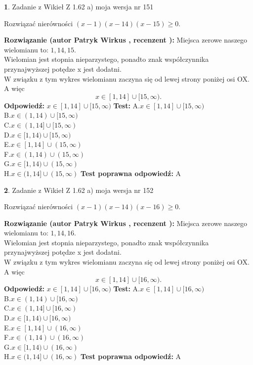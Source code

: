 \documentclass[12pt, a4paper]{article}
\theoremstyle{definition} %
\newtheorem{zad}{}
\newcommand{\zadStart}[1]{\begin{zad}#1\newline}
\newcommand{\zadStop}{\end{zad}}
\newcommand{\rozwStart}[2]{\noindent \textbf{Rozwiązanie (autor #1 , recenzent #2): }\newline}
\newcommand{\rozwStop}{\newline}
\newcommand{\odpStart}{\noindent \textbf{Odpowiedź:}\newline}
\newcommand{\odpStop}{\newline}
\newcommand{\testStart}{\noindent \textbf{Test:}\newline}
\newcommand{\testStop}{\newline}
\newcommand{\kluczStart}{\noindent \textbf{Test poprawna odpowiedź:}\newline}
\newcommand{\kluczStop}{\newline}
\begin{document}
\zadStart{Zadanie z Wikieł Z 1.62 a) moja wersja nr 151}

Rozwiązać nierówności $(x-1)(x-14)(x-15)\ge0$.
\zadStop
\rozwStart{Patryk Wirkus}{}
Miejsca zerowe naszego wielomianu to: $1, 14, 15$.\\
Wielomian jest stopnia nieparzystego, ponadto znak współczynnika przy\linebreak najwyższej potędze x jest dodatni.\\ W związku z tym wykres wielomianu zaczyna się od lewej strony poniżej osi OX. A więc $$x \in [1,14] \cup [15,\infty).$$
\rozwStop
\odpStart
$x \in [1,14] \cup [15,\infty)$
\odpStop
\testStart
A.$x \in [1,14] \cup [15,\infty)$\\
B.$x \in (1,14) \cup [15,\infty)$\\
C.$x \in (1,14] \cup [15,\infty)$\\
D.$x \in [1,14) \cup [15,\infty)$\\
E.$x \in [1,14] \cup (15,\infty)$\\
F.$x \in (1,14) \cup (15,\infty)$\\
G.$x \in [1,14) \cup (15,\infty)$\\
H.$x \in (1,14] \cup (15,\infty)$
\testStop
\kluczStart
A
\kluczStop



\zadStart{Zadanie z Wikieł Z 1.62 a) moja wersja nr 152}

Rozwiązać nierówności $(x-1)(x-14)(x-16)\ge0$.
\zadStop
\rozwStart{Patryk Wirkus}{}
Miejsca zerowe naszego wielomianu to: $1, 14, 16$.\\
Wielomian jest stopnia nieparzystego, ponadto znak współczynnika przy\linebreak najwyższej potędze x jest dodatni.\\ W związku z tym wykres wielomianu zaczyna się od lewej strony poniżej osi OX. A więc $$x \in [1,14] \cup [16,\infty).$$
\rozwStop
\odpStart
$x \in [1,14] \cup [16,\infty)$
\odpStop
\testStart
A.$x \in [1,14] \cup [16,\infty)$\\
B.$x \in (1,14) \cup [16,\infty)$\\
C.$x \in (1,14] \cup [16,\infty)$\\
D.$x \in [1,14) \cup [16,\infty)$\\
E.$x \in [1,14] \cup (16,\infty)$\\
F.$x \in (1,14) \cup (16,\infty)$\\
G.$x \in [1,14) \cup (16,\infty)$\\
H.$x \in (1,14] \cup (16,\infty)$
\testStop
\kluczStart
A
\kluczStop
\end{document}
